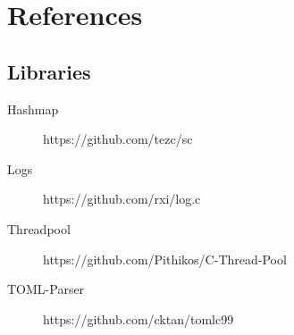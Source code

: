 \section*{References}

\subsection*{Libraries}
\begin{description}
    \item[Hashmap] https://github.com/tezc/sc
    \item[Logs] https://github.com/rxi/log.c
    \item[Threadpool] https://github.com/Pithikos/C-Thread-Pool 
    \item[TOML-Parser] https://github.com/cktan/tomlc99 
\end{description}


